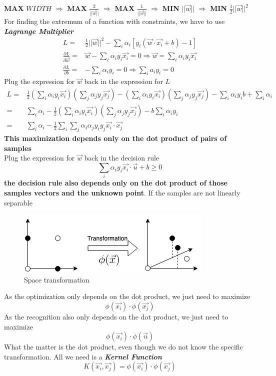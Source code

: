 \documentclass[12pt]{book}
\begin{document}
\indent \textbf{MAX} $WIDTH$ $\Longrightarrow$ \textbf{MAX} $\frac{2}{||\vec{w}||}$ $\Longrightarrow$ \textbf{MAX} $\frac{1}{||\vec{w}||}$ $\Longrightarrow$ \textbf{MIN} $||\vec{w}||$ $\Longrightarrow$ \textbf{MIN} $\frac{1}{2}||\vec{w}||^2  $\\
\indent For finding the extremum of a function with constraints, we have to use \textit{\textbf{Lagrange Multiplier}}
\begin{equation*}
\begin{aligned}
L = &\frac{1}{2}||\vec{w}||^2-\sum_i \alpha_i[y_i(\vec{w}\cdot \vec{x_i}+b)-1]\\
\frac{\partial L}{\partial \vec{w}} = &\vec{w}-\sum_i \alpha_i y_i\vec{x_i} = 0\Longrightarrow \boxed{\vec{w}=\sum_i \alpha_i y_i \vec{x_i}}\\
\frac{\partial L}{\partial b} = &-\sum_i\alpha_iy_i=0\Longrightarrow\boxed{\sum_ia_iy_i=0} 
\end{aligned}
\end{equation*}
\indent Plug the expression for $\vec{w}$ back in the expression for $L$
\begin{equation*}
\begin{aligned}
L = &\frac{1}{2}(\sum_i \alpha_iy_i\vec{x_i})(\sum_j \alpha_jy_j\vec{x_j})-(\sum_i \alpha_iy_i\vec{x_i})(\sum_j \alpha_jy_j\vec{x_j})-\sum_i \alpha_iy_ib+\sum_i \alpha_i\\
=&\sum_i \alpha_i-\frac{1}{2}(\sum_i \alpha_iy_i\vec{x_i})(\sum_j \alpha_jy_j\vec{x_j})-b\sum_i \alpha_iy_i\\
=&\sum_i \alpha_i-\frac{1}{2}\sum_i\sum_j\alpha_i\alpha_jy_iy_j\boxed{\vec{x_i}\cdot\vec{x_j}}
\end{aligned}
\end{equation*}
\indent \textbf{This maximization depends only on the dot product of pairs of samples}\\
\indent Plug the expression for $\vec{w}$ back in the decision rule\\
$$\sum_i\alpha_iy_i\vec{x_i}\cdot\vec{u}+b\geq 0$$
\indent \textbf{the decision rule also depends only on the dot product of those samples vectors and the unknown point}.
\newpage
\indent If the samples are not linearly separable
\begin{figure}[ht]
	\centering
	\includegraphics[scale=0.85]{Figure/Figure16_6.png}
	\caption{Space transformation}
\end{figure}
\newline
\indent As the optimization only depends on the dot product, we just need to maximize
$$\phi({\vec{x_i}})\cdot\phi({\vec{x_j}})$$
\indent As the recognition also only depends on the dot product, we just need to maximize
$$\phi({\vec{x_i}})\cdot\phi({\vec{u}})$$
\indent What the matter is the dot product, even though we do not know the specific transformation. All we need is a \textit{\textbf{Kernel Function}}
$$K(\vec{x_i},\vec{x_j})=\phi(\vec{x_i})\cdot \phi(\vec{x_j})$$
\end{document}
